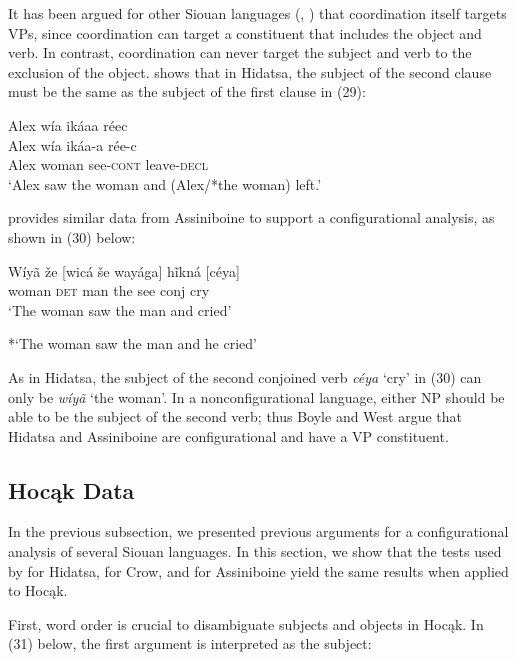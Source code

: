 \documentclass[output=paper]{LSP/langsci}
\begin{document}
It has been argued for other Siouan languages (\citealt{Boyle2007}, \citealt{West2003}) that coordination itself targets VPs, since coordination can target a constituent that includes the object and verb. In contrast, coordination can never target the subject and verb to the exclusion of the object.  \citet{Boyle2007} shows that in Hidatsa, the subject of the second clause must be the same as the subject of the first clause in (29):

\begin{exe}
\ex 
\glll Alex w\'ia ik\'aaa r\'eec\\
Alex w\'ia ik\'aa-a r\'ee-c \\
Alex woman see-\textsc{cont} leave-\textsc{decl} \\
\trans `Alex saw the woman and (Alex/*the woman) left.' \citep[217]{Boyle2007} 
\end{exe}

\citet{West2003} provides similar data from Assiniboine to support a configurational analysis, as shown in (30) below:

\begin{exe}
\ex \gll W\'iy\~a 	 \v{z}e 		[wic\'a 	\v{s}e 	way\'aga] h\~ikn\'a 	[c\'eya] \\
woman 	\textsc{det} 	man 		the see 				conj 		cry \\
\trans `The woman saw the man and cried'

*`The woman saw the man and he cried' \citep[34]{West2003}
\end{exe}

As in Hidatsa, the subject of the second conjoined verb \textit{c\'eya} `cry' in (30) can only be \textit{w\'iy\~a} `the woman'.  In a nonconfigurational language, either NP should be able to be the subject of the second verb; thus Boyle and West argue that Hidatsa and Assiniboine are configurational and have a VP constituent.

\subsection{Hocąk Data}

In the previous subsection, we presented previous arguments for a configurational analysis of several Siouan languages.  In this section, we show that the tests used by \citet{Boyle2007} for Hidatsa, \citet{Graczyk1991} for Crow, and \citet{West2003} for Assiniboine yield the same results when applied to Hocąk.
	
First, word order is crucial to disambiguate subjects and objects in Hocąk.  In (31) below, the first argument is interpreted as the subject:
\end{document}
